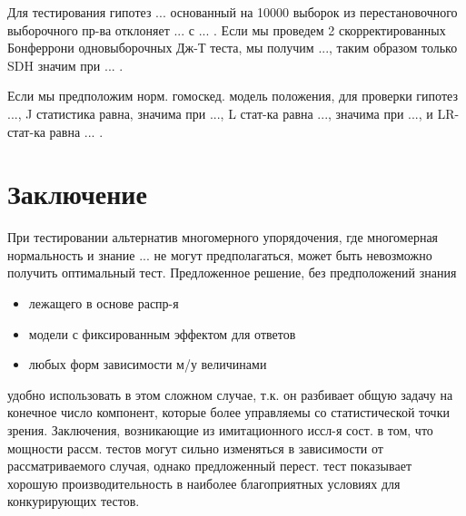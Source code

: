 \documentclass{article}
\begin{document}
Для тестирования гипотез ... основанный на 10000 выборок из перестановочного выборочного пр-ва отклоняет ... с ... . Если мы проведем 2 скорректированных Бонферрони одновыборочных Дж-Т теста, мы получим ..., таким образом только SDH значим при ... .

Если мы предположим норм. гомоскед. модель положения, для проверки гипотез ..., J статистика равна, значима при ..., L стат-ка равна ..., значима при ..., и LR-стат-ка равна ... .

\section{Заключение}
При тестировании альтернатив многомерного упорядочения, где многомерная нормальность и знание ... не могут предполагаться, может быть невозможно получить оптимальный тест. Предложенное решение, без предположений знания
\begin{itemize}
  \item лежащего в основе распр-я

  \item модели с фиксированным эффектом для ответов

  \item любых форм зависимости м/у величинами
\end{itemize}
удобно использовать в этом сложном случае, т.к. он разбивает общую задачу на конечное число компонент, которые более управляемы со статистической точки зрения. Заключения, возникающие из имитационного иссл-я сост. в том, что мощности рассм. тестов могут сильно изменяться в зависимости от рассматриваемого случая, однако предложенный перест. тест показывает хорошую производительность в наиболее благоприятных условиях для конкурирующих тестов.
\end{document}

